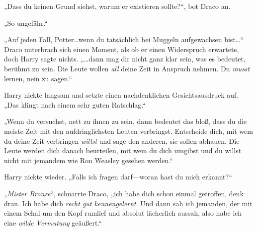 „Dass du keinen Grund siehst, warum er existieren sollte?“, bot Draco an.

„So ungefähr.“

„Auf jeden Fall, Potter…wenn du tatsächlich bei Muggeln aufgewachsen bist…“ Draco unterbrach sich einen Moment, als ob er einen Widerspruch erwartete, doch Harry sagte nichts. „…dann mag dir nicht ganz klar sein, was es bedeutet, berühmt zu sein. Die Leute wollen \emph{all} deine Zeit in Anspruch nehmen. Du \emph{musst} lernen, nein zu sagen.“

Harry nickte langsam und setzte einen nachdenklichen Gesichtsausdruck auf. „Das klingt nach einem sehr guten Ratschlag.“

„Wenn du versuchst, nett zu ihnen zu sein, dann bedeutet das bloß, dass du die meiste Zeit mit den aufdringlichsten Leuten verbringst. Entscheide dich, mit wem du deine Zeit verbringen \emph{willst} und sage den anderen, sie sollen abhauen. Die Leute werden dich danach beurteilen, mit wem du dich umgibst und du willst nicht mit jemandem wie Ron Weasley gesehen werden.“

Harry nickte wieder. „Falls ich fragen darf—woran hast du mich erkannt?“

„\emph{Mister Bronze}“, schnarrte Draco, „ich habe dich schon einmal getroffen, denk dran. Ich habe dich \emph{recht gut kennengelernt}. Und dann sah ich jemanden, der mit einem Schal um den Kopf rumlief und absolut lächerlich aussah, also habe ich eine \emph{wilde Vermutung} geäußert.“

